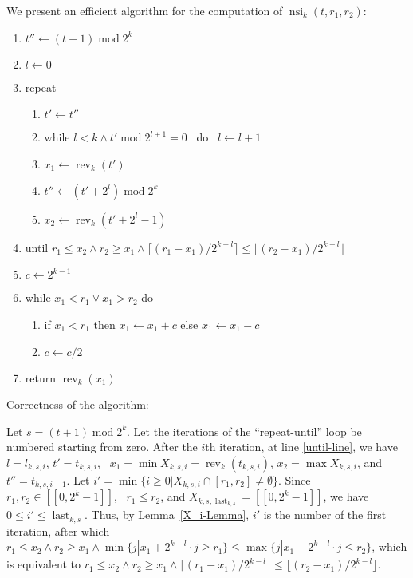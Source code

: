 \documentclass{article}
\newcommand{\tmop}[1]{\ensuremath{\operatorname{#1}}}
\newenvironment{enumeratealpha}{\begin{enumerate}[a{\textup{)}}] }{\end{enumerate}}
\newenvironment{enumeratenumeric}{\begin{enumerate}[1.] }{\end{enumerate}}
\begin{document}
We present an efficient algorithm for the computation of $\tmop{nsi}_k (t,
r_1, r_2)$:
\begin{enumeratenumeric}
  \item $t'' \leftarrow (t + 1) \tmop{mod} 2^k$
  
  \item $l \leftarrow 0$
  
  \item \label{repeat-line}repeat
  \begin{enumeratealpha}
    \item $t' \leftarrow t''$
    
    \item \label{internal-while}while $l < k \wedge t' \tmop{mod} 2^{l + 1} =
    0$ \ do \ $l \leftarrow l + 1$
    
    \item $x_1 \leftarrow \tmop{rev}_k (t')$
    
    \item $t'' \leftarrow (t' + 2^l) \tmop{mod} 2^k$
    
    \item $x_2 \leftarrow \tmop{rev}_k (t' + 2^l - 1)$
  \end{enumeratealpha}
  \item \label{until-line}until $r_1 \leq x_2 \wedge r_2 \geq x_1 \wedge
  \lceil (r_1 - x_1) / 2^{k - l} \rceil \leq \lfloor (r_2 - x_1) / 2^{k - l}
  \rfloor$
  
  \item \label{bin-search-start}$c \leftarrow 2^{k - 1}$
  
  \item \label{bin-search-while}while $x_1 < r_1 \vee x_1 > r_2$ do
  \begin{enumeratealpha}
    \item if $x_1 < r_1$ then $x_1 \leftarrow x_1 + c$ else $x_1 \leftarrow
    x_1 - c$
    
    \item $c \leftarrow c / 2$
  \end{enumeratealpha}
  \item return $\tmop{rev}_k (x_1)$
\end{enumeratenumeric}


Correctness of the algorithm:

Let $s = (t + 1) \tmop{mod} 2^k$. Let the iterations of the ``repeat-until''
loop be numbered starting from zero. After the $i$th iteration, at line
\ref{until-line}, we have $l = l_{k, s, i}$, $t' = t_{k, s, i}$, \ $x_1 = \min
X_{k, s, i} = \tmop{rev}_k (t_{k, s, i})$, $x_2 = \max X_{k, s, i}$, and $t''
= t_{k, s, i + 1}$. Let $i' = \min \{i \geq 0 | X_{k, s, i} \cap [r_1, r_2]
\not=  \emptyset\}$. Since $r_1, r_2 \in [[0, 2^k - 1]]$, \ $r_1 \leq r_2$,
and $X_{k, s, \tmop{last}_{k, s}} = [[0, 2^k - 1]]$, we have $0 \leq i' \leq
\tmop{last}_{k, s}$. Thus, by Lemma~\ref{X_i-Lemma}, $i'$ is the number of the
first iteration, after which$ r_1 \leq x_2 \wedge r_2 \geq x_1 \wedge \min \{j
| x_1 + 2^{k - l} \cdot j \geq r_1 \} \leq \max \{j | x_1 + 2^{k - l} \cdot j
\leq r_2 \}$, which is equivalent to $ r_1 \leq x_2 \wedge r_2 \geq x_1 \wedge
\lceil (r_1 - x_1) / 2^{k - l} \rceil \leq \lfloor (r_2 - x_1) / 2^{k - l}
\rfloor$.
\end{document}
